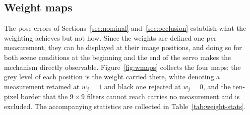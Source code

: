%
%
%

\subsection{Weight maps}
\label{sec:weight-maps}

The pose errors of Sections~\ref{sec:nominal} and~\ref{sec:occlusion}
establish what the weighting achieves but not how. Since the weights are
defined one per measurement, they can be displayed at their image positions,
and doing so for both scene conditions at the beginning and the end of the
servo makes the mechanism directly observable.
Figure~\ref{fig:wmaps} collects the four maps: the grey level of each position
is the weight carried there, white denoting a measurement retained at
$w_{j}=1$ and black one rejected at $w_{j}=0$, and the ten-pixel border that
the $9\times9$ filters cannot reach carries no measurement and is excluded.
The accompanying statistics are collected in Table~\ref{tab:weight-stats}.

